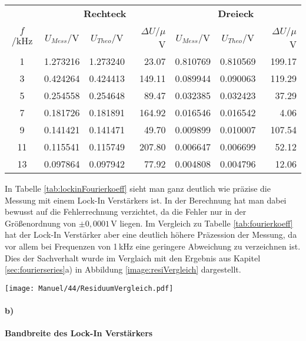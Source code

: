 \begin{center}
    \begin{tabular}{c | c c r | c c r}
        {} & \multicolumn{3}{c|}{\textbf{Rechteck}} & \multicolumn{3}{c}{\textbf{Dreieck}}\\
        $f$/kHz & $U_{Mess}$/V & $U_{Theo}$/V & $\Delta U$/$\mu$V & $U_{Mess}$/V & $U_{Theo}$/V & $\Delta U$/$\mu$V\\
        \hline
         1  & 1.273216 &  1.273240 &   23.07 &   0.810769 &   0.810569 &  199.17 \\
         3  & 0.424264 &  0.424413 &  149.11 &   0.089944 &   0.090063 &  119.29 \\
         5  & 0.254558 &  0.254648 &   89.47 &   0.032385 &   0.032423 &   37.29 \\
         7  & 0.181726 &  0.181891 &  164.92 &   0.016546 &   0.016542 &    4.06 \\
         9  & 0.141421 &  0.141471 &   49.70 &   0.009899 &   0.010007 &  107.54 \\
        11  & 0.115541 &  0.115749 &  207.80 &   0.006647 &   0.006699 &   52.12 \\
        13  & 0.097864 &  0.097942 &   77.92 &   0.004808 &   0.004796 &   12.06 \\
    \end{tabular}
    \label{tab:lockinFourierkoeff}
\end{center} 
In Tabelle \ref{tab:lockinFourierkoeff} sieht man ganz deutlich wie präzise die Messung mit einem Lock-In Verstärkers ist. In der Berechnung hat man dabei bewusst auf die Fehlerrechnung verzichtet, da die Fehler nur in der Größenordnung von $\pm 0,0001$\,V liegen. Im Vergleich zu Tabelle \ref{tab:fourierkoeff} hat der Lock-In Verstärker aber eine deutlich höhere Präzession der Messung, da vor allem bei Frequenzen von 1\,kHz eine geringere Abweichung zu verzeichnen ist. Dies der Sachverhalt wurde im Verglaich mit den Ergebnis aus Kapitel \ref{sec:fourierseries}a) in Abbildung \ref{image:resiVergleich} dargestellt.
\begin{center}
    \texttt{[image: Manuel/44/ResiduumVergleich.pdf]}
    \label{image:resiVergleich}
\end{center} 

\newpage
\paragraph{b)}\textbf{Bandbreite des Lock-In Verstärkers}

